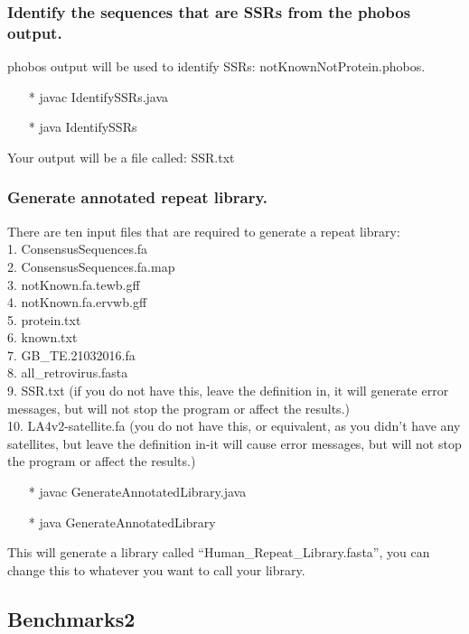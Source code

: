 \documentclass[12pt]{article}
\begin{document}
\subsubsection{Identify the sequences that are SSRs from the phobos output.}
phobos output will be used to identify SSRs: notKnownNotProtein.phobos.
\begin{enumerate}
	\item[*] javac IdentifySSRs.java
	\item[*] java IdentifySSRs
\end{enumerate}
Your output will be a file called: SSR.txt

\subsubsection{Generate annotated repeat library.}
There are ten input files that are required to generate a repeat library: \\
1. ConsensusSequences.fa \\
2. ConsensusSequences.fa.map \\
3. notKnown.fa.tewb.gff \\
4. notKnown.fa.ervwb.gff \\
5. protein.txt \\
6. known.txt \\
7. GB\_TE.21032016.fa \\
8. all\_retrovirus.fasta \\
9. SSR.txt (if you do not have this, leave the definition in, it will generate error messages, but will not stop the program or affect the results.) \\
10. LA4v2-satellite.fa (you do not have this, or equivalent, as you didn't have any satellites, but leave the definition in-it will cause error messages, but will not stop the program or affect the results.)
\begin{enumerate}
	\item[*] javac GenerateAnnotatedLibrary.java
	\item[*] java GenerateAnnotatedLibrary
\end{enumerate}
This will generate a library called \textquotedblleft Human\_Repeat\_Library.fasta\textquotedblright, you can change this to whatever you want to call your library.

\subsection{Benchmarks2}
\end{document}
